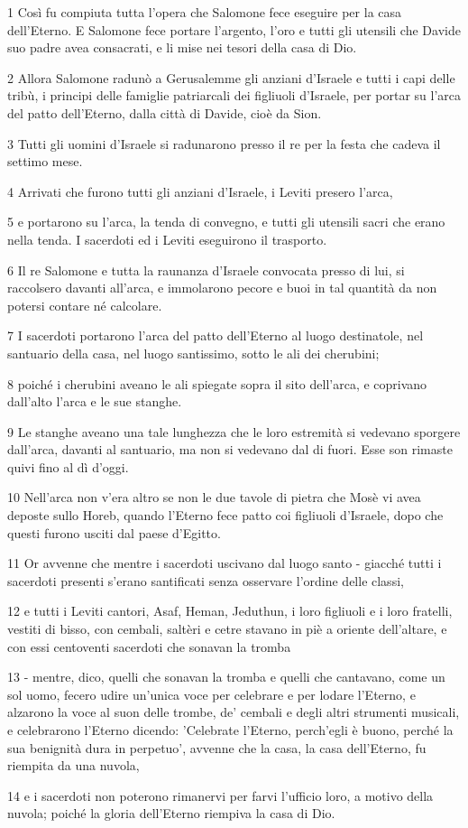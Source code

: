 \par 1 Così fu compiuta tutta l'opera che Salomone fece eseguire per la casa dell'Eterno. E Salomone fece portare l'argento, l'oro e tutti gli utensili che Davide suo padre avea consacrati, e li mise nei tesori della casa di Dio.
\par 2 Allora Salomone radunò a Gerusalemme gli anziani d'Israele e tutti i capi delle tribù, i principi delle famiglie patriarcali dei figliuoli d'Israele, per portar su l'arca del patto dell'Eterno, dalla città di Davide, cioè da Sion.
\par 3 Tutti gli uomini d'Israele si radunarono presso il re per la festa che cadeva il settimo mese.
\par 4 Arrivati che furono tutti gli anziani d'Israele, i Leviti presero l'arca,
\par 5 e portarono su l'arca, la tenda di convegno, e tutti gli utensili sacri che erano nella tenda. I sacerdoti ed i Leviti eseguirono il trasporto.
\par 6 Il re Salomone e tutta la raunanza d'Israele convocata presso di lui, si raccolsero davanti all'arca, e immolarono pecore e buoi in tal quantità da non potersi contare né calcolare.
\par 7 I sacerdoti portarono l'arca del patto dell'Eterno al luogo destinatole, nel santuario della casa, nel luogo santissimo, sotto le ali dei cherubini;
\par 8 poiché i cherubini aveano le ali spiegate sopra il sito dell'arca, e coprivano dall'alto l'arca e le sue stanghe.
\par 9 Le stanghe aveano una tale lunghezza che le loro estremità si vedevano sporgere dall'arca, davanti al santuario, ma non si vedevano dal di fuori. Esse son rimaste quivi fino al dì d'oggi.
\par 10 Nell'arca non v'era altro se non le due tavole di pietra che Mosè vi avea deposte sullo Horeb, quando l'Eterno fece patto coi figliuoli d'Israele, dopo che questi furono usciti dal paese d'Egitto.
\par 11 Or avvenne che mentre i sacerdoti uscivano dal luogo santo - giacché tutti i sacerdoti presenti s'erano santificati senza osservare l'ordine delle classi,
\par 12 e tutti i Leviti cantori, Asaf, Heman, Jeduthun, i loro figliuoli e i loro fratelli, vestiti di bisso, con cembali, saltèri e cetre stavano in piè a oriente dell'altare, e con essi centoventi sacerdoti che sonavan la tromba
\par 13 - mentre, dico, quelli che sonavan la tromba e quelli che cantavano, come un sol uomo, fecero udire un'unica voce per celebrare e per lodare l'Eterno, e alzarono la voce al suon delle trombe, de' cembali e degli altri strumenti musicali, e celebrarono l'Eterno dicendo: 'Celebrate l'Eterno, perch'egli è buono, perché la sua benignità dura in perpetuo', avvenne che la casa, la casa dell'Eterno, fu riempita da una nuvola,
\par 14 e i sacerdoti non poterono rimanervi per farvi l'ufficio loro, a motivo della nuvola; poiché la gloria dell'Eterno riempiva la casa di Dio.

